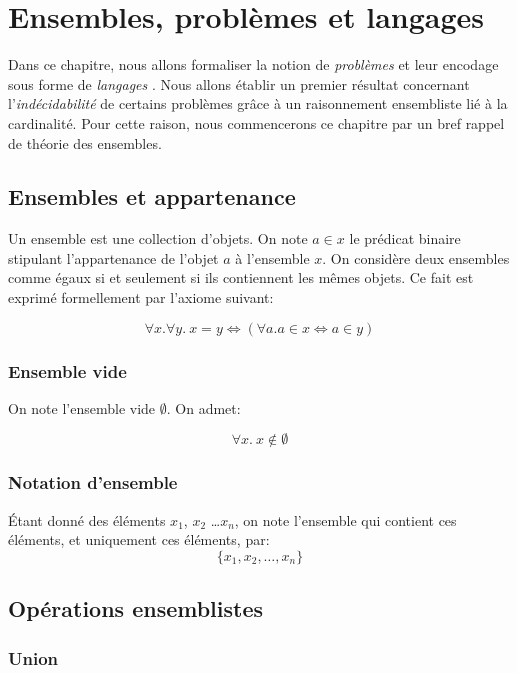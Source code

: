 \chapter{Ensembles, problèmes et langages}

Dans ce chapitre, nous allons formaliser la notion de \og \textit{problèmes} \fg{} et leur encodage sous forme de \og \textit{langages} \fg{}.
Nous allons établir un premier résultat concernant l'\og \textit{indécidabilité} \fg{} de certains problèmes grâce à un raisonnement ensembliste lié à la cardinalité.
Pour cette raison, nous commencerons ce chapitre par un bref rappel de théorie des ensembles.

\section{Ensembles et appartenance}

Un ensemble est une collection d'objets.
On note $a \in x$ le prédicat binaire stipulant l'appartenance de l'objet $a$ à l'ensemble $x$.
On considère deux ensembles comme égaux si et seulement si ils contiennent les mêmes objets.
Ce fait est exprimé formellement par l'axiome suivant:

\[
\forall x. \forall y.\ x = y \iff (\forall a. a \in x \iff a \in y)
\]

\subsection{Ensemble vide}

On note l'ensemble vide $\emptyset$.
On admet:

\[
\forall x.\ x \not\in \emptyset
\]

\subsection{Notation d'ensemble}

Étant donné des éléments $x_1$, $x_2$ \dots $x_n$, on note l'ensemble qui contient ces éléments, et uniquement ces éléments, par:
\[
\{ x_1, x_2, \dots, x_n\}
\]

\section{Opérations ensemblistes}

\subsection{Union}

